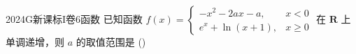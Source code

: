
\begin{problem}{2024}{G}{新课标I卷}{6}{函数}
已知函数 $f(x)=\begin{cases}-x^2-2ax-a, & x<0 \\ e^x+\ln(x+1), & x\geqslant 0\end{cases}$ 在 $\mathbf{R}$ 上单调递增，则 $a$ 的取值范围是
(\hspace{1cm})
\begin{choices}
\choice{{$(-\infty,0]$}}
\choice{{$[-1,0]$}}
\choice{{$[-1,1]$}}
\choice{{$[0,+\infty)$}}
\end{choices}
\end{problem}